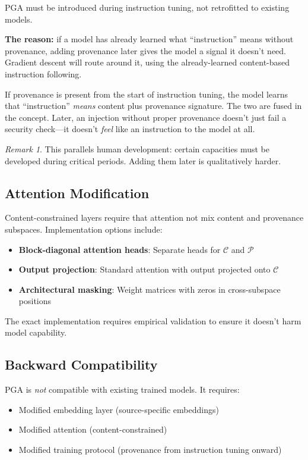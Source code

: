 \documentclass[11pt,a4paper]{article}
\theoremstyle{plain}
\theoremstyle{definition}
\theoremstyle{remark}
\newtheorem{remark}[theorem]{Remark}
\newcommand{\Cspace}{\mathcal{C}}
\newcommand{\Pspace}{\mathcal{P}}
\begin{document}
PGA must be introduced during instruction tuning, not retrofitted to existing models.

\textbf{The reason:} if a model has already learned what ``instruction'' means without provenance, adding provenance later gives the model a signal it doesn't need. Gradient descent will route around it, using the already-learned content-based instruction following.

If provenance is present from the start of instruction tuning, the model learns that ``instruction'' \emph{means} content plus provenance signature. The two are fused in the concept. Later, an injection without proper provenance doesn't just fail a security check---it doesn't \emph{feel} like an instruction to the model at all.

\begin{remark}
This parallels human development: certain capacities must be developed during critical periods. Adding them later is qualitatively harder.
\end{remark}

\subsection{Attention Modification}

Content-constrained layers require that attention not mix content and provenance subspaces. Implementation options include:

\begin{itemize}[noitemsep]
    \item \textbf{Block-diagonal attention heads}: Separate heads for $\Cspace$ and $\Pspace$
    \item \textbf{Output projection}: Standard attention with output projected onto $\Cspace$
    \item \textbf{Architectural masking}: Weight matrices with zeros in cross-subspace positions
\end{itemize}

The exact implementation requires empirical validation to ensure it doesn't harm model capability.

\subsection{Backward Compatibility}

PGA is \emph{not} compatible with existing trained models. It requires:

\begin{itemize}[noitemsep]
    \item Modified embedding layer (source-specific embeddings)
    \item Modified attention (content-constrained)
    \item Modified training protocol (provenance from instruction tuning onward)
\end{itemize}
\end{document}
